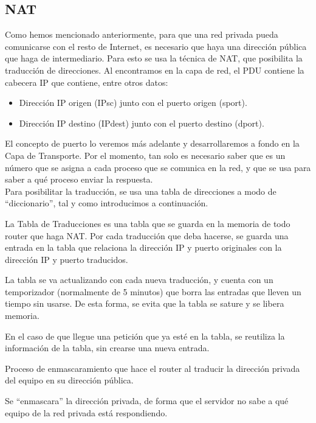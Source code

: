 \subsection{\acrfull{NAT}}

Como hemos mencionado anteriormente, para que una red privada pueda comunicarse con el resto de Internet, es necesario que haya una dirección pública que haga de intermediario. Para esto se usa la técnica de \acrshort{NAT}, que posibilita la traducción de direcciones.
Al encontramos en la capa de red, el \acrshort{PDU} contiene la cabecera IP que contiene, entre otros datos:
\begin{itemize}
    \item Dirección IP origen ({IPsc}) junto con el puerto origen ({sport}).
    \item Dirección IP destino ({IPdest}) junto con el puerto destino ({dport}).
\end{itemize}

El concepto de puerto lo veremos más adelante y desarrollaremos a fondo en la Capa de Transporte. Por el momento, tan solo es necesario saber que es un número que se asigna a cada proceso que se comunica en la red, y que se usa para saber a qué proceso enviar la respuesta.\\

Para posibilitar la traducción, se usa una tabla de direcciones a modo de ``diccionario'', tal y como introducimos a continuación.
\begin{definicion}
    La Tabla de Traducciones es una tabla que se guarda en la memoria de todo router que haga \acrshort{NAT}.
    Por cada traducción que deba hacerse, se guarda una entrada en la tabla que relaciona la dirección IP y puerto originales con la dirección IP y puerto traducidos.

    La tabla se va actualizando con cada nueva traducción, y cuenta con un temporizador (normalmente de 5 minutos) que borra las entradas que lleven un tiempo sin usarse. De esta forma, se evita que la tabla se sature y se libera memoria.

    En el caso de que llegue una petición que ya esté en la tabla, se reutiliza la información de la tabla, sin crearse una nueva entrada.
\end{definicion}

\begin{definicion}
    Proceso de enmascaramiento que hace el router al traducir la dirección privada del equipo en su dirección pública.

    Se ``enmascara'' la dirección privada, de forma que el servidor no sabe a qué equipo de la red privada está respondiendo.
\end{definicion}

